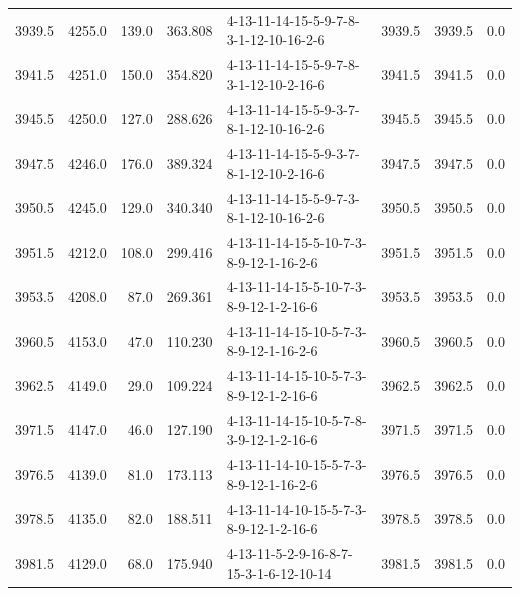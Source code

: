 \begin{tabular}{rrrrlrrr}
 3939.5 &  4255.0 &          139.0 &            363.808 &  4-13-11-14-15-5-9-7-8-3-1-12-10-16-2-6 &        3939.5 &          3939.5 &       0.0 \\
 3941.5 &  4251.0 &          150.0 &            354.820 &  4-13-11-14-15-5-9-7-8-3-1-12-10-2-16-6 &        3941.5 &          3941.5 &       0.0 \\
 3945.5 &  4250.0 &          127.0 &            288.626 &  4-13-11-14-15-5-9-3-7-8-1-12-10-16-2-6 &        3945.5 &          3945.5 &       0.0 \\
 3947.5 &  4246.0 &          176.0 &            389.324 &  4-13-11-14-15-5-9-3-7-8-1-12-10-2-16-6 &        3947.5 &          3947.5 &       0.0 \\
 3950.5 &  4245.0 &          129.0 &            340.340 &  4-13-11-14-15-5-9-7-3-8-1-12-10-16-2-6 &        3950.5 &          3950.5 &       0.0 \\
 3951.5 &  4212.0 &          108.0 &            299.416 &  4-13-11-14-15-5-10-7-3-8-9-12-1-16-2-6 &        3951.5 &          3951.5 &       0.0 \\
 3953.5 &  4208.0 &           87.0 &            269.361 &  4-13-11-14-15-5-10-7-3-8-9-12-1-2-16-6 &        3953.5 &          3953.5 &       0.0 \\
 3960.5 &  4153.0 &           47.0 &            110.230 &  4-13-11-14-15-10-5-7-3-8-9-12-1-16-2-6 &        3960.5 &          3960.5 &       0.0 \\
 3962.5 &  4149.0 &           29.0 &            109.224 &  4-13-11-14-15-10-5-7-3-8-9-12-1-2-16-6 &        3962.5 &          3962.5 &       0.0 \\
 3971.5 &  4147.0 &           46.0 &            127.190 &  4-13-11-14-15-10-5-7-8-3-9-12-1-2-16-6 &        3971.5 &          3971.5 &       0.0 \\
 3976.5 &  4139.0 &           81.0 &            173.113 &  4-13-11-14-10-15-5-7-3-8-9-12-1-16-2-6 &        3976.5 &          3976.5 &       0.0 \\
 3978.5 &  4135.0 &           82.0 &            188.511 &  4-13-11-14-10-15-5-7-3-8-9-12-1-2-16-6 &        3978.5 &          3978.5 &       0.0 \\
 3981.5 &  4129.0 &           68.0 &            175.940 &  4-13-11-5-2-9-16-8-7-15-3-1-6-12-10-14 &        3981.5 &          3981.5 &       0.0 \\
\bottomrule
\end{tabular}
